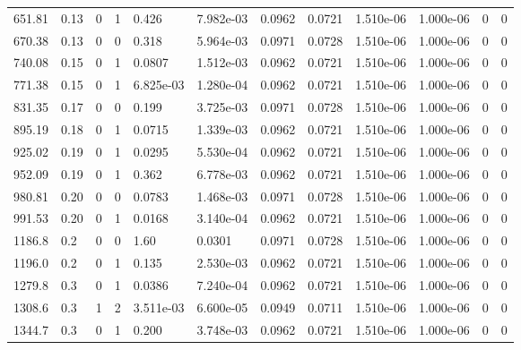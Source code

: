 \documentclass[preview]{standalone}
\begin{document}
{{\begin{tabular}{L{1.2cm}C{1.2cm} C{0.3cm}C{0.5cm} C{1.4cm}C{1.4cm} C{1.4cm}C{1.4cm} C{1.6cm}C{1.6cm} C{1.6cm}C{1.6cm}}
  651.81  &  0.13  & 0     &  1 &  0.426  & 7.982e-03  &  0.0962&   0.0721& 1.510e-06 & 1.000e-06   &  0 & 0  \\ 
  670.38  &  0.13  & 0     &  0 &  0.318  & 5.964e-03  &  0.0971&   0.0728& 1.510e-06 & 1.000e-06   &  0 & 0  \\ 
  740.08  &  0.15  & 0     &  1 &  0.0807  & 1.512e-03  &  0.0962&   0.0721& 1.510e-06 & 1.000e-06   &  0 & 0  \\ 
  771.38  &  0.15  & 0     &  1 &  6.825e-03  & 1.280e-04  &  0.0962&   0.0721& 1.510e-06 & 1.000e-06   &  0 & 0  \\ 
  831.35  &  0.17  & 0     &  0 &  0.199  & 3.725e-03  &  0.0971&   0.0728& 1.510e-06 & 1.000e-06   &  0 & 0  \\ 
  895.19  &  0.18  & 0     &  1 &  0.0715  & 1.339e-03  &  0.0962&   0.0721& 1.510e-06 & 1.000e-06   &  0 & 0  \\ 
  925.02  &  0.19  & 0     &  1 &  0.0295  & 5.530e-04  &  0.0962&   0.0721& 1.510e-06 & 1.000e-06   &  0 & 0  \\ 
  952.09  &  0.19  & 0     &  1 &  0.362  & 6.778e-03  &  0.0962&   0.0721& 1.510e-06 & 1.000e-06   &  0 & 0  \\ 
  980.81  &  0.20  & 0     &  0 &  0.0783  & 1.468e-03  &  0.0971&   0.0728& 1.510e-06 & 1.000e-06   &  0 & 0  \\ 
  991.53  &  0.20  & 0     &  1 &  0.0168  & 3.140e-04  &  0.0962&   0.0721& 1.510e-06 & 1.000e-06   &  0 & 0  \\ 
  1186.8  &   0.2  & 0     &  0 &  1.60  & 0.0301  &  0.0971&   0.0728& 1.510e-06 & 1.000e-06   &  0 & 0  \\ 
  1196.0  &   0.2  & 0     &  1 &  0.135  & 2.530e-03  &  0.0962&   0.0721& 1.510e-06 & 1.000e-06   &  0 & 0  \\ 
  1279.8  &   0.3  & 0     &  1 &  0.0386  & 7.240e-04  &  0.0962&   0.0721& 1.510e-06 & 1.000e-06   &  0 & 0  \\ 
  1308.6  &   0.3  & 1     &  2 &  3.511e-03  & 6.600e-05  &  0.0949&   0.0711& 1.510e-06 & 1.000e-06   &  0 & 0  \\ 
  1344.7  &   0.3  & 0     &  1 &  0.200  & 3.748e-03  &  0.0962&   0.0721& 1.510e-06 & 1.000e-06   &  0 & 0  \\ 
\hline 
\end{tabular} 

}}
\end{document}
